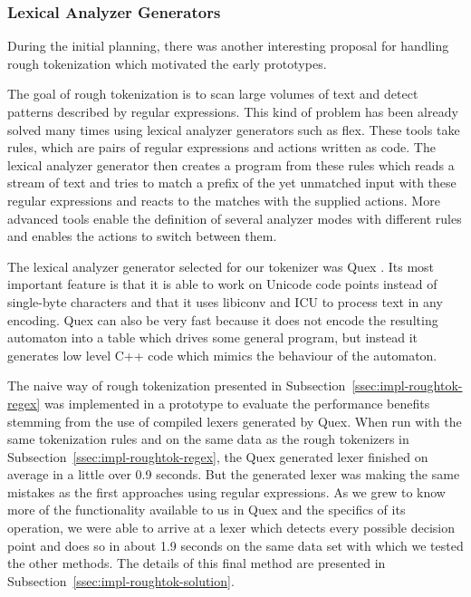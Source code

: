 \subsubsection{Lexical Analyzer Generators}
\label{ssec:impl-roughtok-lexergen}

During the initial planning, there was another interesting proposal for
handling rough tokenization which motivated the early prototypes.

The goal of rough tokenization is to scan large volumes of text and detect
patterns described by regular expressions. This kind of problem has been
already solved many times using lexical analyzer generators such as flex. These
tools take rules, which are pairs of regular expressions and actions written as
code. The lexical analyzer generator then creates a program from these rules
which reads a stream of text and tries to match a prefix of the yet unmatched
input with these regular expressions and reacts to the matches with the
supplied actions. More advanced tools enable the definition of several analyzer
modes with different rules and enables the actions to switch between them.

The lexical analyzer generator selected for our tokenizer was Quex
\cite{web-quex}. Its most important feature is that it is able to work on
Unicode code points instead of single-byte characters and that it uses libiconv
and ICU to process text in any encoding. Quex can also be very fast because it
does not encode the resulting automaton into a table which drives some general
program, but instead it generates low level C++ code which mimics the behaviour
of the automaton.

The naive way of rough tokenization presented in
Subsection~\ref{ssec:impl-roughtok-regex} was implemented in a prototype to
evaluate the performance benefits stemming from the use of compiled lexers
generated by Quex. When run with the same tokenization rules and on the same
data as the rough tokenizers in Subsection~\ref{ssec:impl-roughtok-regex}, the
Quex generated lexer finished on average in a little over 0.9 seconds. But the
generated lexer was making the same mistakes as the first approaches using
regular expressions. As we grew to know more of the functionality available to
us in Quex and the specifics of its operation, we were able to arrive at a
lexer which detects every possible decision point and does so in about 1.9
seconds on the same data set with which we tested the other methods. The
details of this final method are presented in
Subsection~\ref{ssec:impl-roughtok-solution}.

